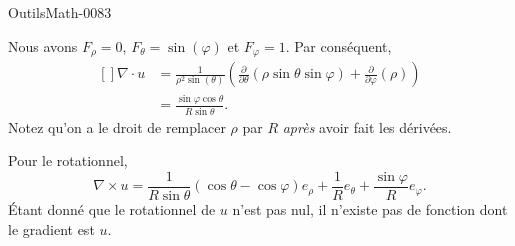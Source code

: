 
\begin{corrige}{OutilsMath-0083}

    Nous avons $F_{\rho}=0$, $F_{\theta}=\sin(\varphi)$ et $F_{\varphi}=1$. Par conséquent,
    \begin{equation}
            \begin{aligned}[]
        \nabla\cdot u&=\frac{1}{ \rho^2\sin(\theta) }\left( \frac{ \partial  }{ \partial \theta }(\rho\sin\theta\sin\varphi)+\frac{ \partial  }{ \partial \varphi }(\rho) \right)\\
        &=\frac{ \sin\varphi\cos\theta }{ R\sin\theta }.
            \end{aligned}
    \end{equation}
    Notez qu'on a le droit de remplacer $\rho$ par $R$ \emph{après} avoir fait les dérivées.

    Pour le rotationnel,
    \begin{equation}
        \nabla\times u=\frac{1}{ R\sin\theta }(\cos\theta-\cos\varphi)e_{\rho}+\frac{1}{ R }e_{\theta}+\frac{ \sin\varphi }{ R }e_{\varphi}.
    \end{equation}
    Étant donné que le rotationnel de $u$ n'est pas nul, il n'existe pas de fonction dont le gradient est $u$.

\end{corrige}
